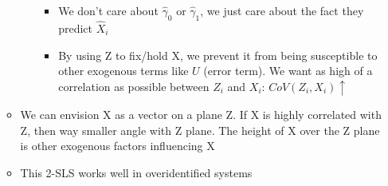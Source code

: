 \documentclass[10pt, oneside]{article}
\begin{document}
\begin{itemize}
\begin{itemize}
\begin{itemize}
\begin{itemize}
                \item We don't care about $\hat \gamma_0$ or $\hat \gamma_1$, we just care about the fact they predict $\hat X_i$
                \item By using Z to fix/hold X, we prevent it from being susceptible to other exogenous terms like $U$ (error term). We want as high of a correlation as possible between $Z_i$ and $X_i$: $CoV(Z_i, X_i)\uparrow$
            \end{itemize}
        \end{itemize}
        \item We can envision X as a vector on a plane Z. If X is highly correlated with Z, then way smaller angle with Z plane. The height of X over the Z plane is other exogenous factors influencing X
        \item This 2-SLS works well in overidentified systems
    \end{itemize}
\end{itemize}
\end{document}
